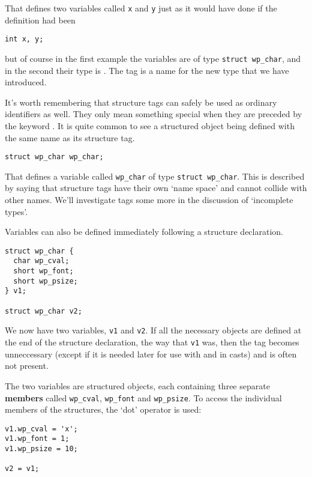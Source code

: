   That defines two variables called \texttt{x} and \texttt{y} just
   as it would have done if the definition had been


  \begin{Verbatim}
int x, y;
\end{Verbatim}

  but of course in the first example the variables are of type \texttt{struct
   wp\_char}, and in the second their type is \kint. The tag is
   a name for the new type that we have introduced.


  It's worth remembering that structure tags can safely be used as ordinary
   identifiers as well. They only mean something special when they are preceded
   by the keyword \struct. It is quite common to see a structured
   object being defined with the same name as its structure tag.


  \begin{Verbatim}
struct wp_char wp_char;
\end{Verbatim}

  That defines a variable called \texttt{wp\_char} of type \texttt{struct
   wp\_char}. This is described by saying that structure tags have their
   own `name space' and cannot collide with other names. We'll
   investigate tags some more in the discussion of `incomplete
   types'.


  Variables can also be defined immediately following a structure
   declaration.


  \begin{Verbatim}
struct wp_char {
  char wp_cval;
  short wp_font;
  short wp_psize;
} v1;

struct wp_char v2;
\end{Verbatim}

  We now have two variables, \texttt{v1} and \texttt{v2}. If all the
   necessary objects are defined at the end of the structure declaration, the
   way that \texttt{v1} was, then the tag becomes unneccessary (except if
   it is needed later for use with \sizeof{} and in casts) and is
   often not present.


  The two variables are structured objects, each containing three separate
   \textbf{members} called \texttt{wp\_cval}, \texttt{wp\_font} and
   \texttt{wp\_psize}. To access the individual members of the structures,
   the `dot' operator is used:


  \begin{Verbatim}
v1.wp_cval = 'x';
v1.wp_font = 1;
v1.wp_psize = 10;

v2 = v1;
\end{Verbatim}

